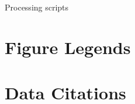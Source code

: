 \documentclass[english]{article}
\begin{document}
\begin{sidewaystable}
    \caption{Processing scripts}
    \label{table:processing-scripts}
\end{sidewaystable}

\section*{Figure Legends}




\section*{Data Citations}
\end{document}
